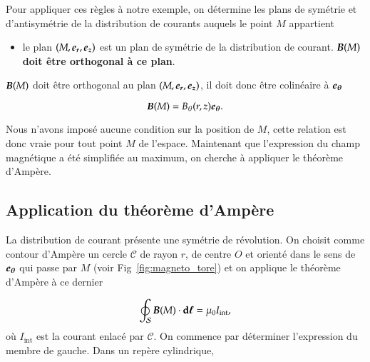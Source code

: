 Pour appliquer ces règles à notre exemple, on détermine les plans de symétrie 
et d'antisymétrie de la distribution de courants auquels 
le point $M$ appartient

\begin{itemize}
	\item le plan $(M, \er, \ez)$ est un plan de symétrie de la distribution
	  de courant. $\vecb(M)$ \textbf{doit être orthogonal à ce plan}.
\end{itemize}

$\vecb(M)$ doit être orthogonal au plan $(M, \er, \ez)$, 
il doit donc être colinéaire à $\etheta$

\begin{framed}
\begin{equation*}
	\vecb(M) = B_\theta(r, z) \etheta.
\end{equation*}
\end{framed}

Nous n'avons imposé aucune condition sur la position de $M$, cette relation est
donc vraie pour tout point $M$ de l'espace. Maintenant que l'expression du 
champ magnétique a été simplifiée au maximum, on cherche à appliquer le théorème
d'Ampère.

\subsection{Application du théorème d'Ampère}
La distribution de courant présente une symétrie de révolution. On choisit comme contour 
d'Ampère un cercle $\mathcal{C}$ de rayon $r$, de centre $O$ et orienté
dans le sens de $\etheta$ qui passe par $M$ 
(voir Fig~\ref{fig:magneto_tore}) et on applique le théorème d'Ampère à ce dernier

\begin{equation*}
	\oint_\mathcal{S} \vecb(M) \cdot \dl = \mu_0 I_\mathrm{int},
	\label{eq:cavite_gauss}
\end{equation*}
où $I_\mathrm{int}$ est la courant enlacé par $\mathcal{C}$. On commence
par déterminer l'expression du membre de gauche. Dans un repère cylindrique,

